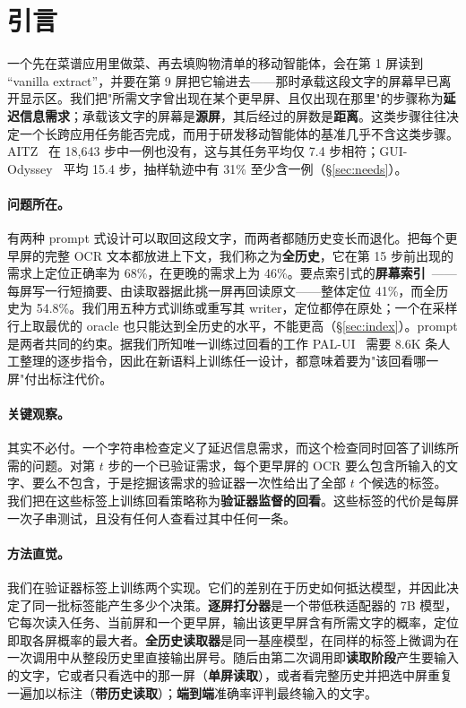\section{引言}
一个先在菜谱应用里做菜、再去填购物清单的移动智能体，会在第 1 屏读到 ``vanilla extract''，并要在第 9 屏把它输进去——那时承载这段文字的屏幕早已离开显示区。我们把"所需文字曾出现在某个更早屏、且仅出现在那里"的步骤称为\textbf{延迟信息需求}；承载该文字的屏幕是\textbf{源屏}，其后经过的屏数是\textbf{距离}。这类步骤往往决定一个长跨应用任务能否完成，而用于研发移动智能体的基准几乎不含这类步骤。AITZ~\citep{aitz} 在 18,643 步中一例也没有，这与其任务平均仅 7.4 步相符；GUI-Odyssey~\citep{guiodyssey} 平均 15.4 步，抽样轨迹中有 31\% 至少含一例（\S\ref{sec:needs}）。

\paragraph{问题所在。} 有两种 prompt 式设计可以取回这段文字，而两者都随历史变长而退化。把每个更早屏的完整 OCR 文本都放进上下文，我们称之为\textbf{全历史}，它在第 15 步前出现的需求上定位正确率为 68\%，在更晚的需求上为 46\%。要点索引式的\textbf{屏幕索引}~\citep{readagent}——每屏写一行短摘要、由读取器据此挑一屏再回读原文——整体定位 41\%，而全历史为 54.8\%。我们用五种方式训练或重写其 writer，定位都停在原处；一个在采样行上取最优的 oracle 也只能达到全历史的水平，不能更高（\S\ref{sec:index}）。prompt 是两者共同的约束。据我们所知唯一训练过回看的工作 PAL-UI~\citep{palui} 需要 8.6K 条人工整理的逐步指令，因此在新语料上训练任一设计，都意味着要为"该回看哪一屏"付出标注代价。

\paragraph{关键观察。} 其实不必付。一个字符串检查定义了延迟信息需求，而这个检查同时回答了训练所需的问题。对第 $t$ 步的一个已验证需求，每个更早屏的 OCR 要么包含所输入的文字、要么不包含，于是挖掘该需求的验证器一次性给出了全部 $t$ 个候选的标签。我们把在这些标签上训练回看策略称为\textbf{验证器监督的回看}。这些标签的代价是每屏一次子串测试，且没有任何人查看过其中任何一条。

\paragraph{方法直觉。} 我们在验证器标签上训练两个实现。它们的差别在于历史如何抵达模型，并因此决定了同一批标签能产生多少个决策。\textbf{逐屏打分器}是一个带低秩适配器的 7B 模型，它每次读入任务、当前屏和一个更早屏，输出该更早屏含有所需文字的概率，定位即取各屏概率的最大者。\textbf{全历史读取器}是同一基座模型，在同样的标签上微调为在一次调用中从整段历史里直接输出屏号。随后由第二次调用即\textbf{读取阶段}产生要输入的文字，它或者只看选中的那一屏（\textbf{单屏读取}），或者看完整历史并把选中屏重复一遍加以标注（\textbf{带历史读取}）；\textbf{端到端}准确率评判最终输入的文字。


